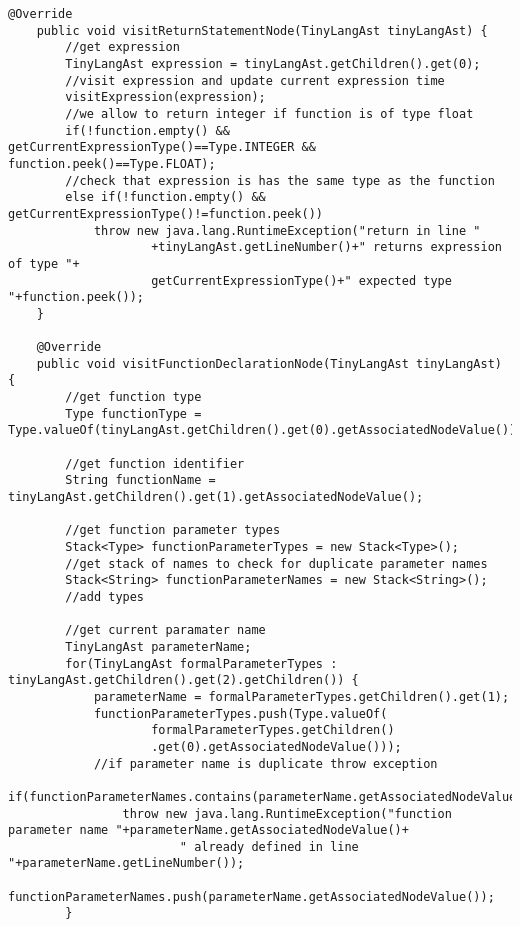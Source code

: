 \begin{lstlisting}[basicstyle=\miniscule,caption=Semantic Analyser,label=listing:semanticanalyser]
	@Override
	public void visitReturnStatementNode(TinyLangAst tinyLangAst) {
		//get expression 
		TinyLangAst expression = tinyLangAst.getChildren().get(0);
		//visit expression and update current expression time
		visitExpression(expression);
		//we allow to return integer if function is of type float
		if(!function.empty() && getCurrentExpressionType()==Type.INTEGER && function.peek()==Type.FLOAT);
		//check that expression is has the same type as the function
		else if(!function.empty() && getCurrentExpressionType()!=function.peek())
			throw new java.lang.RuntimeException("return in line "
					+tinyLangAst.getLineNumber()+" returns expression of type "+
					getCurrentExpressionType()+" expected type "+function.peek());
	}

	@Override
	public void visitFunctionDeclarationNode(TinyLangAst tinyLangAst) {
		//get function type
		Type functionType = Type.valueOf(tinyLangAst.getChildren().get(0).getAssociatedNodeValue());

		//get function identifier
		String functionName = tinyLangAst.getChildren().get(1).getAssociatedNodeValue();
		
		//get function parameter types 
		Stack<Type> functionParameterTypes = new Stack<Type>();
		//get stack of names to check for duplicate parameter names
		Stack<String> functionParameterNames = new Stack<String>();
		//add types
		
		//get current paramater name
		TinyLangAst parameterName;
		for(TinyLangAst formalParameterTypes : tinyLangAst.getChildren().get(2).getChildren()) { 
			parameterName = formalParameterTypes.getChildren().get(1);
			functionParameterTypes.push(Type.valueOf(
					formalParameterTypes.getChildren()
					.get(0).getAssociatedNodeValue()));
			//if parameter name is duplicate throw exception
			if(functionParameterNames.contains(parameterName.getAssociatedNodeValue()))
				throw new java.lang.RuntimeException("function parameter name "+parameterName.getAssociatedNodeValue()+ 
						" already defined in line "+parameterName.getLineNumber());
			functionParameterNames.push(parameterName.getAssociatedNodeValue());
		}


\end{lstlisting}
